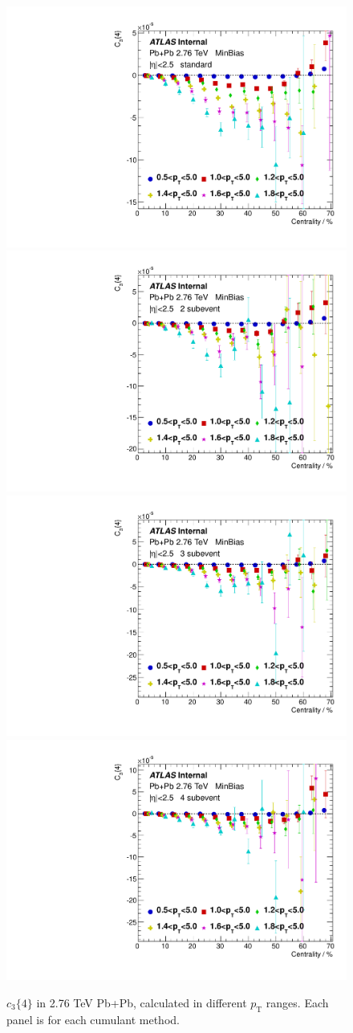 \begin{figure}[H]
\centering
\includegraphics[width=.245\linewidth]{figs/sec_appendix/PbPb276/PbPb276_pT_1sub_Har3.pdf}
\includegraphics[width=.245\linewidth]{figs/sec_appendix/PbPb276/PbPb276_pT_2sub_Har3.pdf}
\includegraphics[width=.245\linewidth]{figs/sec_appendix/PbPb276/PbPb276_pT_3sub_Har3.pdf}
\includegraphics[width=.245\linewidth]{figs/sec_appendix/PbPb276/PbPb276_pT_4sub_Har3.pdf}
\caption{$c_3\{4\}$ in 2.76 TeV Pb+Pb, calculated in different $p_\text{T}$ ranges. Each panel is for each cumulant method.}
\label{fig:PbPb276_pT_v3}
\end{figure}

